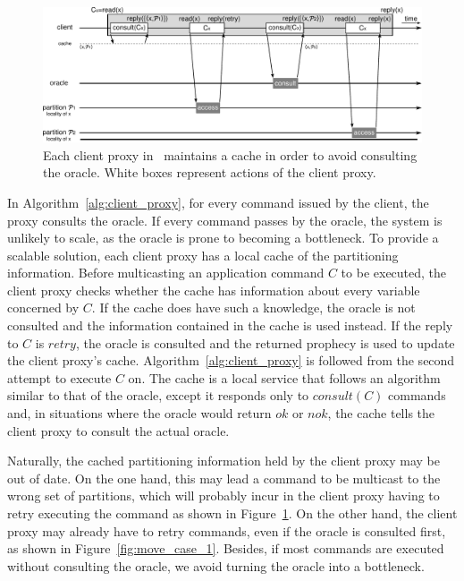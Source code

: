 \begin{figure}
\begin{minipage}[b]{1\linewidth} %
\centering
      \includegraphics[width=0.65\linewidth]{figures/cache_retry}
\end{minipage}
\caption{Each client proxy in \dssmr\ maintains a cache in order to avoid  consulting the oracle. White boxes represent actions of the client proxy.}
\label{fig:cache_retry}
\end{figure}

In Algorithm~\ref{alg:client_proxy}, for every command issued by the client, the proxy consults the oracle.
If every command passes by the oracle, the system is unlikely to scale, as the oracle is prone to becoming a bottleneck.
To provide a scalable solution, each client proxy has a local cache of the partitioning information.
Before multicasting an application command $C$ to be executed, the client proxy checks whether the cache has information about every variable concerned by $C$.
If the cache does have such a knowledge, the oracle is not consulted and the information contained in the cache is used instead.
If the reply to $C$ is $retry$, the oracle is consulted and the returned prophecy is used to update the client proxy's cache.
Algorithm~\ref{alg:client_proxy} is followed from the second attempt to execute $C$ on.
The cache is a local service that follows an algorithm similar to that of the oracle, except it responds only to $consult(C)$ commands and, in situations where the oracle would return $ok$ or $nok$, the cache tells the client proxy to consult the actual oracle.




Naturally, the cached partitioning information held by the client proxy may be out of date.
On the one hand, this may lead a command to be multicast to the wrong set of partitions, which will probably incur in the client proxy having to retry executing the command as shown in Figure~\ref{fig:cache_retry}.
On the other hand, the client proxy may already have to retry commands, even if the oracle is consulted first, as shown in Figure~\ref{fig:move_case_1}.
Besides, if most commands are executed without consulting the oracle, we avoid turning the oracle into a bottleneck.


